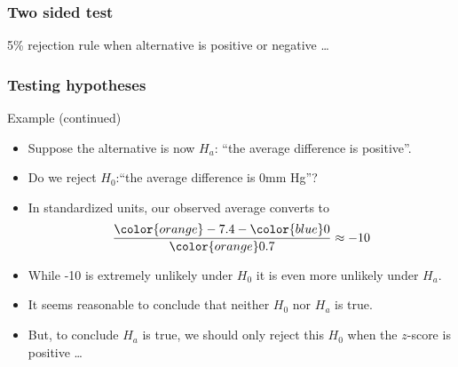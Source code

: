 \documentclass[handout]{beamer}
\begin{document}
   \begin{frame}
   \frametitle{Two sided test}
   \begin{center}
   \end{center}
   {\color{blue} 5\% rejection rule} when alternative is positive or negative \dots
   \end{frame}


   \begin{frame} \frametitle{Testing hypotheses}

   \begin{block}
   {Example (continued)}
   \begin{itemize}

   \item Suppose the alternative is now $H_a$: ``the average difference is positive''.
   \item Do we reject $H_0$:``the average difference is 0mm Hg''?

    \item In standardized units, our observed average converts to
    $$
    \frac{{\color{orange}-7.4} - {\color{blue} 0}}{\color{orange} 0.7} \approx -10
    $$

   \item While -10 is extremely unlikely under $H_0$ it is even more
   unlikely under $H_a$.

   \item It seems reasonable to conclude that neither $H_0$ nor
   $H_a$ is true.

   \item But, to conclude $H_a$ is true, we should only reject this $H_0$ when the $z$-score is positive \dots
   \end{itemize}
   \end{block}
   \end{frame}

\end{document}

